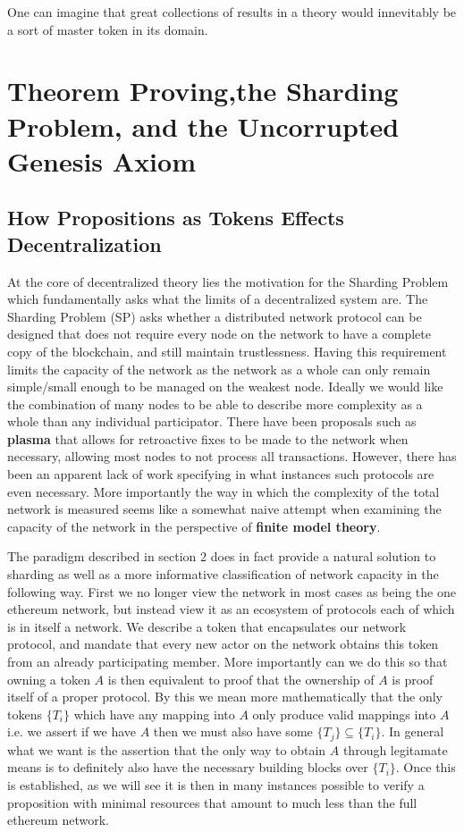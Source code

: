 \documentclass[12pt]{amsart}
\begin{document}
One can imagine that great collections of results in a theory would innevitably be a sort of master token in its domain.


\section{Theorem Proving,the Sharding Problem, and the Uncorrupted Genesis Axiom}

\subsection{How Propositions as Tokens Effects Decentralization}

At the core of decentralized theory lies the motivation for the Sharding Problem which fundamentally asks what the limits of a decentralized system are. The Sharding Problem (SP) asks whether a distributed network protocol can be designed that does not require every node on the network to have a complete copy of the blockchain, and still maintain trustlessness. Having this requirement limits the capacity of the network as the network as a whole can only remain simple/small enough to be managed on the weakest node. Ideally we would like the combination of many nodes to be able to describe more complexity as a whole than any individual participator. There have been proposals such as \textbf{plasma} that allows for retroactive fixes to be made to the network when necessary, allowing most nodes to not process all transactions. However, there has been an apparent lack of work specifying in what instances such protocols are even necessary. More importantly the way in which the complexity of the total network is measured seems like a somewhat naive attempt when examining the capacity of the network in the perspective of \textbf{finite model theory}.\newline

 The paradigm described in section 2 does in fact provide a natural solution to sharding as well as a more informative classification of network capacity in the following way. First we no longer view the network in most cases as being the one ethereum network, but instead view it as an ecosystem of protocols each of which is in itself a network. We describe a token that encapsulates our network protocol, and mandate that every new actor on the network obtains this token from an already participating member. More importantly can we do this so that owning a token $A$ is then equivalent to proof that the ownership of $A$ is proof itself of a proper protocol. By this we mean more mathematically that the only tokens $\{T_i\}$ which have any mapping into $A$ only produce valid mappings into $A$ i.e. we assert if we have $A$ then we must also have some $\{T_j\}\subseteq \{T_i\}$. In general what we want is the assertion that the only way to obtain $A$ through legitamate means is to definitely also have the necessary building blocks over $\{T_i\}$. Once this is established, as we will see it is then in many instances possible to verify a proposition with minimal resources that amount to much less than the full ethereum network.\newline
\end{document}
